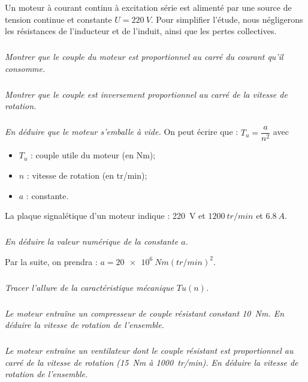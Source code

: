 \documentclass[10pt,fleqn]{article} %
\begin{document}
\begin{multicols}{2}
\begin{multicols}{2}
\setcounter{exo}{0}

Un moteur à courant continu à excitation série est alimenté par une source de tension continue
et constante $U = \SI{220}{V}$.
Pour simplifier l’étude, nous négligerons les résistances de l’inducteur et de l’induit, ainsi que
les pertes collectives.

\subparagraph{}\textit{Montrer que le couple du moteur est proportionnel au carré du courant qu’il consomme.}
\ifprof
\begin{corrige}
\end{corrige}
\else
\fi

\subparagraph{}\textit{Montrer que le couple est inversement proportionnel au carré de la vitesse de rotation.}
\ifprof
\begin{corrige}
\end{corrige}
\else
\fi

\subparagraph{}\textit{En déduire que le moteur s’emballe à vide.}
On peut écrire que : $T_u = \dfrac{a}{n^2}$ avec 
\begin{itemize}
\item $T_u$ : couple utile du moteur (en Nm);
\item $n$ : vitesse de rotation (en tr/min);
\item $a$ : constante.
\end{itemize}
La plaque signalétique d’un moteur indique : \SI{220}{V} et $\SI{1200}{tr/min}$ et $\SI{6,8}{A}$.

\subparagraph{}\textit{En déduire la valeur numérique de la constante $a$.}
\ifprof
\begin{corrige}
\end{corrige}
\else
\fi

Par la suite, on prendra : $a = \SI{20e6}{Nm(tr/min)^2}$.



\subparagraph{}\textit{Tracer l’allure de la caractéristique mécanique $Tu(n)$.}
\ifprof
\begin{corrige}
\end{corrige}
\else
\fi

\subparagraph{}\textit{Le moteur entraîne un compresseur de couple résistant constant \SI{10}{Nm}.
En déduire la vitesse de rotation de l’ensemble.}
\ifprof
\begin{corrige}
\end{corrige}
\else
\fi

\subparagraph{}\textit{Le moteur entraîne un ventilateur dont le couple résistant est proportionnel au carré de la
vitesse de rotation (\SI{15}{Nm} à \SI{1000}{tr/min}).
En déduire la vitesse de rotation de l’ensemble.}




\end{multicols}
\end{multicols}
\end{document}
